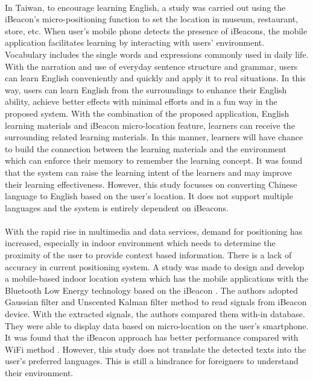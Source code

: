 \documentclass[12pt]{article}
\begin{document}
\paragraph{}In Taiwan, to encourage learning English, a study was carried out using the iBeacon's micro-positioning function to set the location in museum, restaurant, store, etc. When user's mobile phone detects the presence of iBeacons, the mobile application facilitates learning by interacting with users' environment. \cite{taiwan} Vocabulary includes the single words and expressions commonly used in daily life. With the narration and use of everyday sentence structure and grammar, users can learn English conveniently and quickly and apply it to real situations. In this way, users can learn English from the surroundings to enhance their English ability, achieve better effects with minimal efforts and in a fun way in the proposed system. With the combination of the proposed application, English learning materials and iBeacon micro-location feature, learners can receive the surrounding related learning materials. In this manner, learners will have chance to build the connection between the learning materials and the environment which can enforce their memory to remember the learning concept.  \cite{taiwan} It was found that the system can raise the learning intent of the learners and may improve their learning effectiveness. However, this study focusses on converting Chinese language to English based on the user's location. It does not support multiple languages and the system is entirely dependent on iBeacons.

\paragraph{} With the rapid rise in multimedia and data services, demand for positioning has increased, especially in indoor environment which needs to determine the proximity  of the user to provide context based information. \cite{services} There is a lack of accuracy in current positioning system. A study was made to design and develop a mobile-based indoor location system which has the mobile applications with the Bluetooth Low Energy technology based on the iBeacon \cite{indoor}. The authors adopted Gaussian filter and Unscented Kalman filter method to read signals from iBeacon device. With the extracted signals, the authors compared them with-in database. They were able to display data based on micro-location on the user's smartphone.  It was found that the iBeacon approach has better performance compared with WiFi method  \cite{indoor}. However, this study does not translate the detected texts into the user's preferred languages. This is still a hindrance for foreigners to understand their environment.
\end{document}
